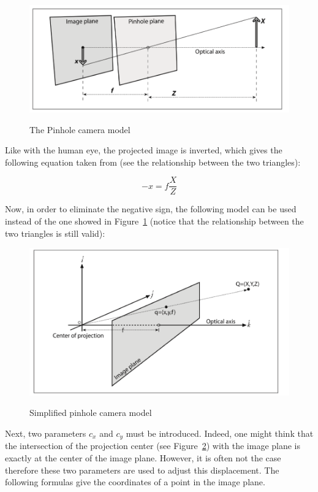 \begin{figure}[t]
\caption{The Pinhole camera model}
\centering
    \includegraphics[width=1.0\textwidth]{images/pinhole.png}
\label{fig:pinhole}
\end{figure}

Like with the human eye, the projected image is inverted, which gives the following equation taken from \cite[p. 371]{bradski_learning_2008} (see the relationship between the two triangles):

\begin{equation}
  -x = f\frac{X}{Z}          
\end{equation}

Now, in order to eliminate the negative sign, the following model \cite[p. 372]{bradski_learning_2008} can be used instead of the one showed in Figure~\ref{fig:pinhole} (notice that the relationship between the two triangles is still valid):

\begin{figure}[h]
\caption{Simplified pinhole camera model}
\centering
    \includegraphics[width=1.0\textwidth]{images/simplifiedPinhole.png}
\label{fig:simplifiedPinhole}
\end{figure}

Next, two parameters $c_x$ and $c_y$ must be introduced. Indeed, one might think that the intersection of the projection center (see Figure~\ref{fig:simplifiedPinhole}) with the image plane is exactly at the center of the image plane. However, it is often not the case therefore these two parameters are used to adjust this displacement. The following formulas \cite[p. 373]{bradski_learning_2008} give the coordinates of a point in the image plane. 


